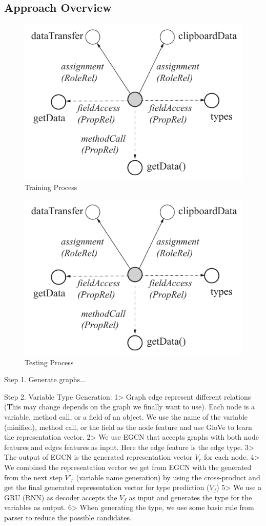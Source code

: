 \subsection{Approach Overview}


\begin{figure}[t]
	\begin{center}
		\includegraphics[width=.7\columnwidth]{figures/stargraph.pdf}
		\caption{Training Process}
		\label{training_process}
	\end{center}
\end{figure}

\begin{figure}[t]
	\begin{center}
		\includegraphics[width=.7\columnwidth]{figures/stargraph.pdf}
		\caption{Testing Process}
		\label{testing_process}
	\end{center}
\end{figure}

Step 1. Generate graphs...

Step 2. Variable Type Generation:
1> Graph edge represent different relations (This may change depends on the graph we finally want to use). Each node is a variable, method call, or a field of an object. We use the name of the variable (minified), method call, or the field as the node feature and use GloVe to learn the representation vector.
2> We use EGCN that accepts graphs with both node features and edges features as input. Here the edge feature is the edge type. 
3> The output of EGCN is the generated representation vector $V_r$ for each node. 
4> We combined the representation vector we get from EGCN with the generated from the next step $V'_r$ (variable name generation) by using the cross-product and get the final generated representation vector for type prediction ($V_f$)
5> We use a GRU (RNN) as decoder accepts the $V_f$ as input and generates the type for the variables as output.
6> When generating the type, we use some basic rule from parser to reduce the possible candidates.


